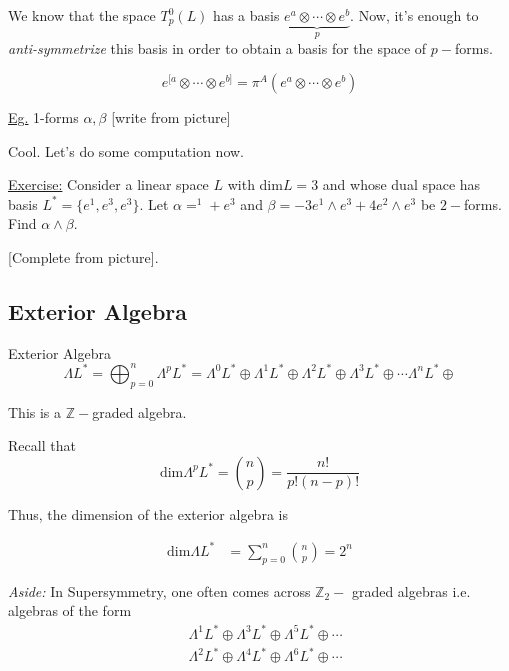 \documentclass{article}
\begin{document}
We know that the space $T_p^0(L)$ has a basis $\underbrace{e^a \otimes \cdots \otimes e^b}_{p}$. Now, it's enough to \emph{anti-symmetrize} this basis in order to obtain a basis for the space of $p-$forms.

\[ e^{[a }\otimes \cdots \otimes e^{b]} = \pi^A \left(e^a \otimes \cdots \otimes e^b \right)  \]

\vskip 0.5cm
\underline{Eg.} 1-forms $\alpha, \beta$ [write from picture]

\vskip 1cm
Cool. Let's do some computation now.
\vskip 0.5cm

\begin{dottedbox}
  \underline{Exercise:} Consider a linear space $L$ with dim$L = 3$ and whose dual space has basis $L^* = \{e^1, e^3, e^3\}$. Let $\alpha = ^1 + e^3$ and $\beta = -3e^1 \wedge e^3 + 4e^2 \wedge e^3$ be $2-$forms. Find $\alpha \wedge \beta$.
\end{dottedbox}

[Complete from picture].


\vskip 1cm
\subsection{Exterior Algebra}

\begin{mathdefinitionbox}{Exterior Algebra}
  \[ \Lambda L^* = \bigoplus_{p = 0}^{n} \Lambda^p L^* = \Lambda^0 L^* \oplus \Lambda^1 L^* \oplus \Lambda^2 L^* \oplus \Lambda^3 L^* \oplus \cdots \Lambda^n L^* \oplus \]
\end{mathdefinitionbox}

This is a $\mathbb{Z}-$graded algebra. 

Recall that 
\[ \text{dim}\Lambda^p L^* = \binom{n}{p} = \frac{n!}{p!(n-p)!}   \]

Thus, the dimension of the exterior algebra is 

\begin{align*}
  \text{dim}\Lambda L^* &= \sum_{p = 0}^n \binom{n}{p} = 2^n
\end{align*}

\vskip 0.5cm
\begin{dottedbox}
  \emph{Aside:} In Supersymmetry, one often comes across $\mathbb{Z}_2 -$ graded algebras i.e. algebras of the form 
  \begin{align*}
    &\Lambda^1 L^* \oplus \Lambda^3 L^* \oplus \Lambda^5 L^* \oplus \cdots \\
    &\Lambda^2 L^* \oplus \Lambda^4 L^* \oplus \Lambda^6 L^* \oplus \cdots \\
  \end{align*}
\end{dottedbox}
\end{document}
